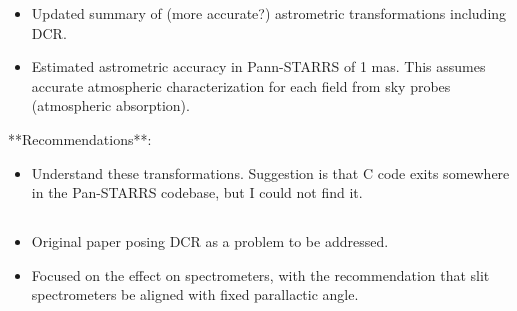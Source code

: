 \documentclass[]{article}
\begin{document}
\begin{itemize}
	\item Updated summary of (more accurate?) astrometric transformations including DCR.
	\item Estimated astrometric accuracy in Pann-STARRS of 1
          mas. This assumes accurate atmospheric characterization for
          each field from sky probes (atmospheric absorption).
\end{itemize}

**Recommendations**:
\begin{itemize}
	\item Understand these transformations. Suggestion is that C
          code exits somewhere in the Pan-STARRS codebase, but I could
          not find it.
\end{itemize}

\subsection{\cite{Cuby1998}}

\subsection{\cite{Filippenko1982}}
\begin{itemize}
	\item Original paper posing DCR as a problem to be addressed.
	\item Focused on the effect on spectrometers, with the
          recommendation that slit spectrometers be aligned with fixed
          parallactic angle.
\end{itemize}
\end{document}
